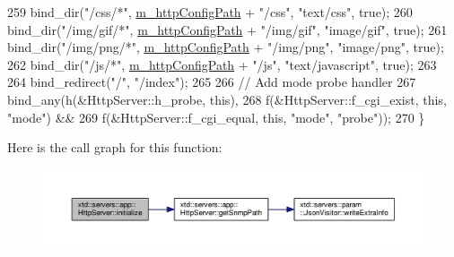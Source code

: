 \begin{DoxyCode}
259   bind\_dir(\textcolor{stringliteral}{"/css/*"},        \hyperlink{classxtd_1_1servers_1_1app_1_1HttpServer_abfb9586e84fa5149da3226eeea39980f}{m\_httpConfigPath} + \textcolor{stringliteral}{"/css"},        \textcolor{stringliteral}{"text/css"},        \textcolor{keyword}{true});
260   bind\_dir(\textcolor{stringliteral}{"/img/gif/*"},    \hyperlink{classxtd_1_1servers_1_1app_1_1HttpServer_abfb9586e84fa5149da3226eeea39980f}{m\_httpConfigPath} + \textcolor{stringliteral}{"/img/gif"},    \textcolor{stringliteral}{"image/gif"},       \textcolor{keyword}{true});
261   bind\_dir(\textcolor{stringliteral}{"/img/png/*"},    \hyperlink{classxtd_1_1servers_1_1app_1_1HttpServer_abfb9586e84fa5149da3226eeea39980f}{m\_httpConfigPath} + \textcolor{stringliteral}{"/img/png"},    \textcolor{stringliteral}{"image/png"},       \textcolor{keyword}{true});
262   bind\_dir(\textcolor{stringliteral}{"/js/*"},         \hyperlink{classxtd_1_1servers_1_1app_1_1HttpServer_abfb9586e84fa5149da3226eeea39980f}{m\_httpConfigPath} + \textcolor{stringliteral}{"/js"},         \textcolor{stringliteral}{"text/javascript"}, \textcolor{keyword}{true});
263 
264   bind\_redirect(\textcolor{stringliteral}{"/"}, \textcolor{stringliteral}{"/index"});
265 
266   \textcolor{comment}{// Add mode probe handler}
267   bind\_any(h(&HttpServer::h\_probe, \textcolor{keyword}{this}),
268            f(&HttpServer::f\_cgi\_exist, \textcolor{keyword}{this}, \textcolor{stringliteral}{"mode"}) &&
269            f(&HttpServer::f\_cgi\_equal, \textcolor{keyword}{this}, \textcolor{stringliteral}{"mode"}, \textcolor{stringliteral}{"probe"}));
270 \}
\end{DoxyCode}


Here is the call graph for this function\+:
\nopagebreak
\begin{figure}[H]
\begin{center}
\leavevmode
\includegraphics[width=350pt]{classxtd_1_1servers_1_1app_1_1HttpServer_a0924e53b6bc9de7563c33690d619ce9d_cgraph}
\end{center}
\end{figure}


